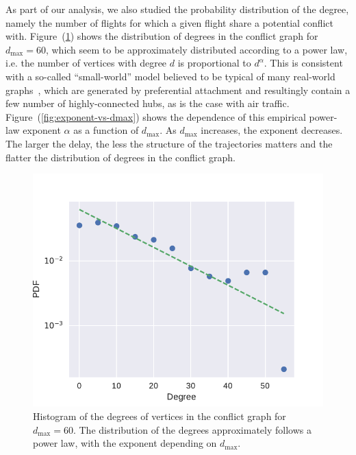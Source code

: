 As part of our analysis, we also studied the probability
distribution of the degree, namely the number of flights
for which a given flight share a potential conflict with. 
Figure~(\ref{fig:hist-degree}) shows
the distribution of degrees in the conflict graph for $d_{\max}=60$,
which seem to be approximately distributed according to a power law, i.e. 
the number of vertices with degree $d$ is proportional to $d^{\alpha}$.
This is consistent with a so-called ``small-world'' model believed to be typical of many real-world graphs~\cite{barabasi:99}, which are generated by preferential attachment and resultingly contain a few number of highly-connected hubs, as is the case with air traffic.
Figure~(\ref{fig:exponent-vs-dmax}) shows the dependence of this empirical power-law exponent $\alpha$ as a function of $d_{\max}$.
As $d_{\max}$ increases, the exponent decreases.
The larger the delay, the less the structure of the trajectories matters and the flatter the distribution of degrees in the conflict graph.

\begin{figure}[htpb]
\includegraphics[width=0.95\columnwidth]{pics/instances/connectivity_pdf.pdf}
\caption[Histogram of degrees]{Histogram of the degrees of vertices in the conflict graph for $d_{\max} = 60$. 
The distribution of the degrees approximately follows a power law, with the exponent depending on $d_{\max}$.
}
\label{fig:hist-degree}
\end{figure}


